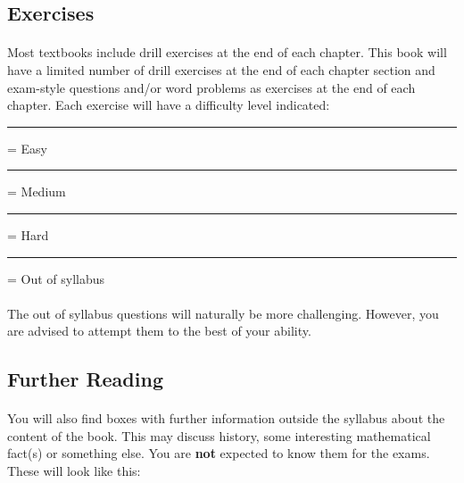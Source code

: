 \documentclass[12pt, a4paper, titlepage, twoside]{article}
\newcommand\crule[1][black]{\textcolor{#1}{\rule{0.5cm}{0.5cm}}}
\begin{document}
	\subsection*{Exercises}
	
	\paragraph{}
	Most textbooks include drill exercises at the end of each chapter. This book will have a limited number of drill exercises at the end of
	each chapter section and exam-style questions and/or word problems as exercises at the end of each chapter. Each exercise will have 
	a difficulty level indicated:\\
	
	\crule[green] = Easy \quad \crule[yellow] = Medium \quad \crule[red] = Hard \quad \crule[gray!30] = Out of syllabus

	\paragraph{}
	The out of syllabus questions will naturally be more challenging. However, you are advised to attempt them to the best of your
	ability.
	
	\subsection*{Further Reading}
	
	\paragraph{}
	You will also find boxes with further information outside the syllabus about the content of the book. This may discuss history, 
	some interesting mathematical fact(s) or something else. You are \textbf{not} expected to know them for the exams. These will look 
	like this:\\
	
\end{document}
